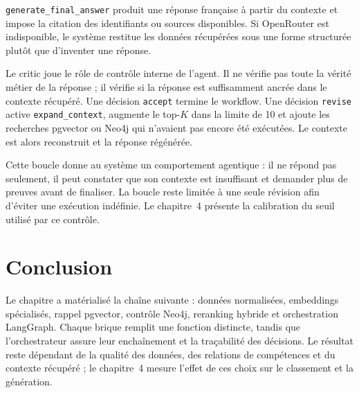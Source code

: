 \texttt{generate\_final\_answer} produit une réponse française à partir du contexte et impose la citation des identifiants ou sources disponibles. Si OpenRouter est indisponible, le système restitue les données récupérées sous une forme structurée plutôt que d'inventer une réponse.

Le critic joue le rôle de contrôle interne de l'agent. Il ne vérifie pas toute la vérité métier de la réponse ; il vérifie si la réponse est suffisamment ancrée dans le contexte récupéré. Une décision \texttt{accept} termine le workflow. Une décision \texttt{revise} active \texttt{expand\_context}, augmente le top-$K$ dans la limite de 10 et ajoute les recherches pgvector ou Neo4j qui n'avaient pas encore été exécutées. Le contexte est alors reconstruit et la réponse régénérée.

Cette boucle donne au système un comportement agentique : il ne répond pas seulement, il peut constater que son contexte est insuffisant et demander plus de preuves avant de finaliser. La boucle reste limitée à une seule révision afin d'éviter une exécution indéfinie. Le chapitre~4 présente la calibration du seuil utilisé par ce contrôle.

\section*{Conclusion}

Le chapitre a matérialisé la chaîne suivante : données normalisées, embeddings spécialisés, rappel pgvector, contrôle Neo4j, reranking hybride et orchestration LangGraph. Chaque brique remplit une fonction distincte, tandis que l'orchestrateur assure leur enchaînement et la traçabilité des décisions. Le résultat reste dépendant de la qualité des données, des relations de compétences et du contexte récupéré ; le chapitre~4 mesure l'effet de ces choix sur le classement et la génération.
